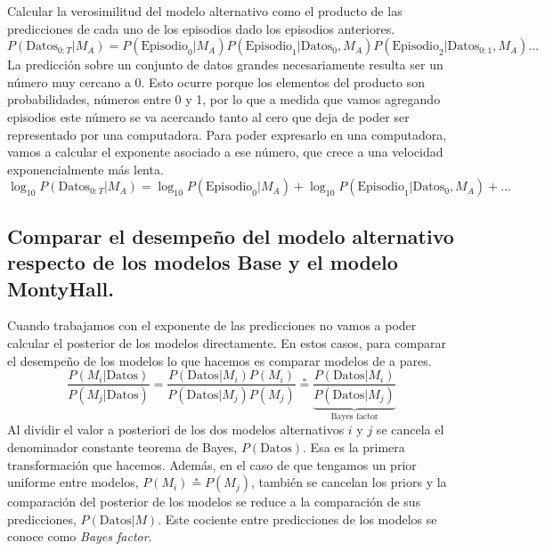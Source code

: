 \documentclass[a4paper,10pt]{article}
\begin{document}
Calcular la verosimilitud del modelo alternativo como el producto de las predicciones de cada uno de los episodios dado los episodios anteriores.
%
\begin{equation*}
P(\text{Datos}_{0:T}|M_A) = P(\text{Episodio}_0|M_A)P(\text{Episodio}_1|\text{Datos}_{0}, M_A) P(\text{Episodio}_2|\text{Datos}_{0:1}, M_A) \dots
\end{equation*}
%
La predicción sobre un conjunto de datos grandes necesariamente resulta ser un número muy cercano a 0.
%
Esto ocurre porque los elementos del producto son probabilidades, números entre 0 y 1, por lo que a medida que vamos agregando episodios este número se va acercando tanto al cero que deja de poder ser representado por una computadora.
%
Para poder expresarlo en una computadora, vamos a calcular el exponente asociado a ese número, que crece a una velocidad exponencialmente más lenta.
%
\begin{equation*}
\log_{10} P(\text{Datos}_{0:T}|M_A) = \log_{10} P(\text{Episodio}_0|M_A) + \log_{10} P(\text{Episodio}_1|\text{Datos}_{0}, M_A) + \dots
\end{equation*}


\subsection{Comparar el desempeño del modelo alternativo respecto de los modelos Base y el modelo MontyHall.}

Cuando trabajamos con el exponente de las predicciones no vamos a poder calcular el posterior de los modelos directamente.
%
En estos casos, para comparar el desempeño de los modelos lo que hacemos es comparar modelos de a pares.
%
\begin{equation}
\frac{P(M_i|\text{Datos})}{P(M_j|\text{Datos})} = \frac{P(\text{Datos}|M_i)P(M_i)}{P(\text{Datos}|M_j)P(M_j)} \overset{*}{=} \underbrace{\frac{P(\text{Datos}|M_i)}{P(\text{Datos}|M_j)}}_{\text{Bayes factor}}
\end{equation}
%
Al dividir el valor a posteriori de los dos modelos alternativos $i$ y $j$ se cancela el denominador constante teorema de Bayes, $P(\text{Datos})$.
%
Esa es la primera transformación que hacemos.
%
Además, en el caso de que tengamos un prior uniforme entre modelos, $P(M_i)\overset{*}{=}P(M_j)$, también se cancelan los priors y la comparación del posterior de los modelos se reduce a la comparación de sus predicciones, $P(\text{Datos}|M)$.
%
Este cociente entre predicciones de los modelos se conoce como \textit{Bayes factor}.
\end{document}
